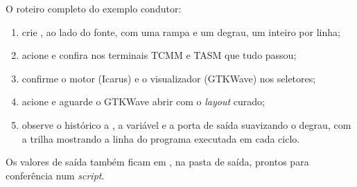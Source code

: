 O roteiro completo do exemplo condutor:

\begin{enumerate}
  \item crie , ao lado do fonte, com uma rampa e um degrau, um inteiro por linha;
  \item acione  e confira nos terminais TCMM e TASM que tudo passou;
  \item confirme o motor (Icarus) e o visualizador (GTKWave) nos seletores;
  \item acione  e aguarde o GTKWave abrir com o \textit{layout} curado;
  \item observe o histórico  a , a variável  e a porta de saída suavizando o degrau, com a trilha \cmm{} mostrando a linha do programa executada em cada ciclo.
\end{enumerate}

Os valores de saída também ficam em , na pasta de saída, prontos para conferência num \textit{script}.

